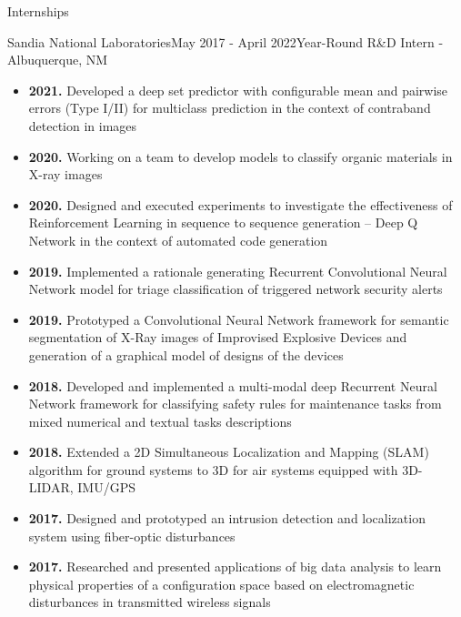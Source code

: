 \documentclass{resume} %
\begin{document}
\begin{rSection}{Internships}
\begin{rSubsection}{Sandia National Laboratories}{May 2017 - April 2022}{Year-Round R\&D Intern - Albuquerque, NM}
\begin{itemize}[label={}]
    \setlength\itemsep{0em}
    \item \textbf{2021.} Developed a deep set predictor with configurable mean and pairwise errors (Type I/II) for multiclass prediction in the context of contraband detection in images
    \item \textbf{2020.} Working on a team to develop models to classify organic materials in X-ray images
    \item \textbf{2020.} Designed and executed experiments to investigate the effectiveness of Reinforcement Learning in sequence to sequence generation -- Deep Q Network in the context of automated code generation
    \item \textbf{2019.} Implemented a rationale generating Recurrent Convolutional Neural Network model for triage classification of triggered network security alerts
    \item \textbf{2019.} Prototyped a Convolutional Neural Network framework for semantic segmentation of X-Ray images of Improvised Explosive Devices and generation of a graphical model of designs of the devices
    \item \textbf{2018.} Developed and implemented a multi-modal deep Recurrent Neural Network framework for classifying safety rules for maintenance tasks from mixed numerical and textual tasks descriptions
    \item \textbf{2018.} Extended a 2D Simultaneous Localization and Mapping (SLAM) algorithm for ground systems to 3D for air systems equipped with 3D-LIDAR, IMU/GPS
    \item \textbf{2017.} Designed and prototyped an intrusion detection and localization system using fiber-optic disturbances 
    \item \textbf{2017.} Researched and presented applications of big data analysis to learn physical properties of a configuration space based on electromagnetic disturbances in transmitted wireless signals
\end{itemize}

\end{rSubsection}
\end{rSection}

\end{document}
